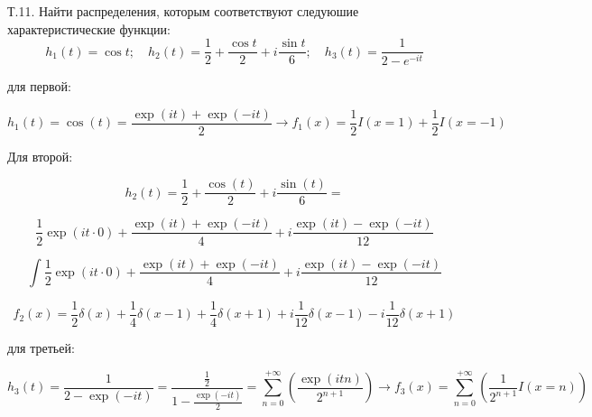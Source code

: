 \documentclass[a4paper,12pt]{article} %
\begin{document}
\begin{example}

Т.11. Найти распределения, которым соответствуют следуюшие характеристические функции:
$$
h_{1}(t)=\cos t ; 
\quad 
h_{2}(t)=\frac{1}{2}+\frac{\cos t}{2}+i \frac{\sin t}{6} ; 
\quad 
h_{3}(t)=\frac{1}{2-e^{-i t}}
$$


для первой:


\begin{equation}
h_{1}(t)=\cos (t)=\frac{\exp (i t)+\exp (-i t)}{2} \rightarrow f_{1}(x)=\frac{1}{2} I(x=1)+\frac{1}{2} I(x=-1)
\end{equation}





Для второй:

$$
h_{2}(t)=\frac{1}{2}+\frac{\cos (t)}{2}+i \frac{\sin (t)}{6}=
$$


$$
\frac{1}{2} \exp (i t \cdot 0)+\frac{\exp (i t)+\exp (-i t)}{4}+i \frac{\exp (i t)-\exp (-i t)}{12}
$$


$$
\int \frac{1}{2} \exp (i t \cdot 0)+\frac{\exp (i t)+\exp (-i t)}{4}+i \frac{\exp (i t)-\exp (-i t)}{12}
$$


$$
f_{2}(x)=\frac{1}{2} \delta(x)+\frac{1}{4} \delta(x-1)+\frac{1}{4} \delta(x+1)+i \frac{1}{12} \delta(x-1)-i \frac{1}{12} \delta(x+1)
$$



для третьей:


$$
h_{3}(t)=\frac{1}{2-\exp (-i t)}=\frac{\frac{1}{2}}{1-\frac{\exp (-i t)}{2}}=\sum_{n=0}^{+\infty}\left(\frac{\exp (i t n)}{2^{n+1}}\right) \rightarrow f_{3}(x)=\sum_{n=0}^{+\infty}\left(\frac{1}{2^{n+1}} I(x=n)\right)
$$







\end{example}
\end{document}
